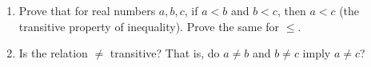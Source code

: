 \begin{enumerate}
\item[(a)] Prove that for real numbers $a,b,c$, if $a<b$ and $b<c$, then $a<c$ (the transitive property of inequality). Prove the same for $\le$.
\item[(b)] Is the relation $\ne$ transitive? That is, do $a\ne b$ and $b\ne c$ imply $a\ne c$?
\end{enumerate}
